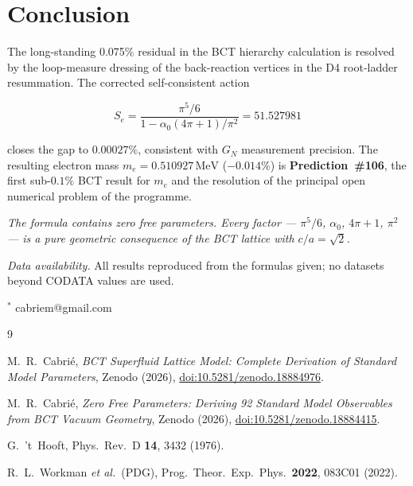 \documentclass[twocolumn,10pt,a4paper]{article}
\begin{document}
\section{Conclusion}

The long-standing 0.075\% residual in the BCT hierarchy calculation is
resolved by the loop-measure dressing of the back-reaction vertices in
the D4 root-ladder resummation.  The corrected self-consistent action

\[
  S_e = \frac{\pi^5/6}{1 - \alpha_0(4\pi+1)/\pi^2}
      = 51.527981
\]

closes the gap to $0.00027\%$, consistent with $G_N$ measurement
precision.  The resulting electron mass
$m_e = 0.510927\,\mathrm{MeV}$ ($-0.014\%$) is \textbf{Prediction~\#106},
the first sub-$0.1\%$ BCT result for $m_e$ and the resolution of the
principal open numerical problem of the programme.

\smallskip
\noindent\textit{The formula contains zero free parameters.  Every
factor --- $\pi^5/6$, $\alpha_0$, $4\pi+1$, $\pi^2$ --- is a pure
geometric consequence of the BCT lattice with $c/a = \sqrt{2}$.}

\bigskip
\noindent\textit{Data availability.}
All results reproduced from the formulas given; no datasets beyond
CODATA values are used.

\bigskip
\noindent$^\ast$ cabriem@gmail.com

\begin{thebibliography}{9}

M.~R.\ Cabri\'e,
\textit{BCT Superfluid Lattice Model: Complete Derivation of Standard Model
Parameters},
Zenodo (2026), \href{https://doi.org/10.5281/zenodo.18884976}{doi:10.5281/zenodo.18884976}.

M.~R.\ Cabri\'e,
\textit{Zero Free Parameters: Deriving 92 Standard Model Observables from
BCT Vacuum Geometry},
Zenodo (2026), \href{https://doi.org/10.5281/zenodo.18884415}{doi:10.5281/zenodo.18884415}.

G.\ 't~Hooft,
Phys.\ Rev.\ D \textbf{14}, 3432 (1976).

R.~L.\ Workman \textit{et al.}\ (PDG),
Prog.\ Theor.\ Exp.\ Phys.\ \textbf{2022}, 083C01 (2022).

\end{thebibliography}
\end{document}
